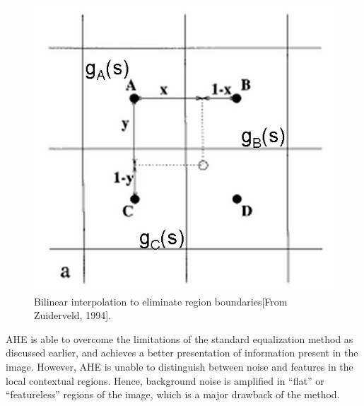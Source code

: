\begin{figure}
	\centering
	\includegraphics[scale=0.7]{images/ch3/bilinearInterpolation.jpg}
	\caption{Bilinear interpolation to eliminate region boundaries[From Zuiderveld, 1994].}
	\label{fig:bilinearInterpolation}
\end{figure}

AHE is able to overcome the limitations of the standard equalization
method as discussed earlier, and achieves a better presentation of information
present in the image. However, AHE is unable to distinguish between noise and
features in the local contextual regions. Hence, background noise is amplified in
“flat” or “featureless” regions of the image, which is a major drawback of the
method\cite{he2}.


